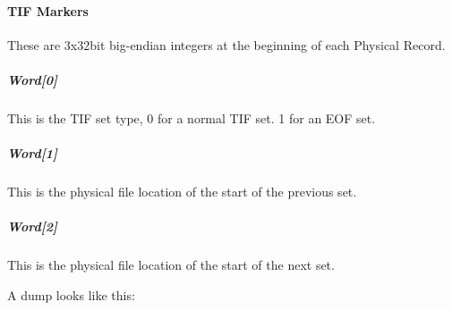 \documentclass[letterpaper,10pt,english]{sphinxmanual}
\begin{document}
\paragraph{TIF Markers}
\label{\detokenize{ref/LIS/core/TifMarker:tif-markers}}
These are 3x32bit big-endian integers at the beginning of each Physical Record.


\subparagraph{Word{[}0{]}}
\label{\detokenize{ref/LIS/core/TifMarker:word-0}}
This is the TIF set type, 0 for a normal TIF set. 1 for an EOF set.


\subparagraph{Word{[}1{]}}
\label{\detokenize{ref/LIS/core/TifMarker:word-1}}
This is the physical file location of the start of the previous set.


\subparagraph{Word{[}2{]}}
\label{\detokenize{ref/LIS/core/TifMarker:word-2}}
This is the physical file location of the start of the next set.

A dump looks like this:
\end{document}
